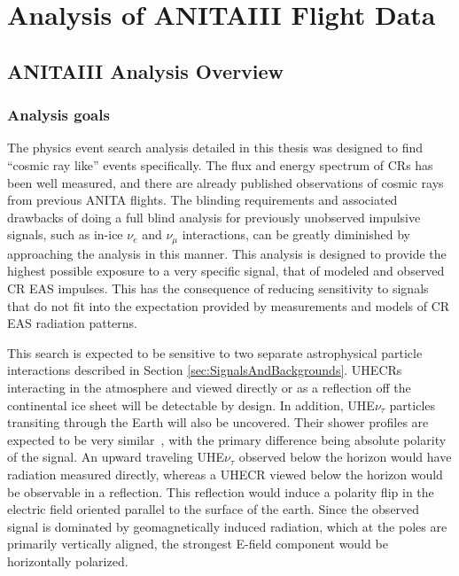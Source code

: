 \chapter{Analysis of ANITAIII Flight Data}
\section{ANITAIII Analysis Overview}%

	\subsection{Analysis goals}
	The physics event search analysis detailed in this thesis was designed to find ``cosmic ray like'' events specifically.  The flux and energy spectrum of CRs has been well measured, and there are already published observations of cosmic rays from previous ANITA flights. The blinding requirements and associated drawbacks of doing a full blind analysis for previously unobserved impulsive signals, such as in-ice $\nu_{e}$ and $\nu_{\mu}$ interactions, can be greatly diminished by approaching the analysis in this manner.  This analysis is designed to provide the highest possible exposure to a very specific signal, that of modeled and observed CR EAS impulses.  This has the consequence of reducing sensitivity to signals that do not fit into the expectation provided by measurements and models of CR EAS radiation patterns.
	
	This search is expected to be sensitive to two separate astrophysical particle interactions described in Section \ref{sec:SignalsAndBackgrounds}.  UHECRs interacting in the atmosphere and viewed directly or as a reflection off the continental ice sheet will be detectable by design.  In addition, UHE$\nu_{\tau}$ particles transiting through the Earth will also be uncovered.  Their shower profiles are expected to be very similar~\cite{tauEMShowers}, with the primary difference being absolute polarity of the signal.  An upward traveling UHE$\nu_{\tau}$ observed below the horizon would have radiation measured directly, whereas a UHECR viewed below the horizon would be observable in a reflection.  This reflection would induce a polarity flip in the electric field oriented parallel to the surface of the earth.  Since the observed signal is dominated by geomagnetically induced radiation, which at the poles are primarily vertically aligned, the strongest E-field component would be horizontally polarized.
	

